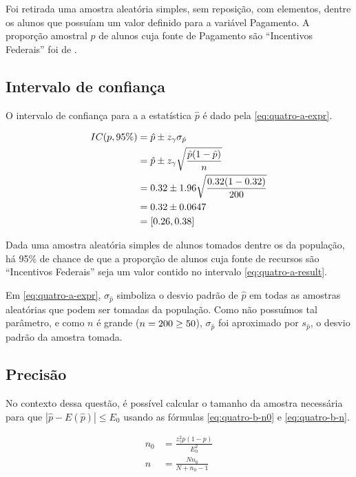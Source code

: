 

Foi retirada uma amostra aleatória simples, sem reposição, com \QUATROn elementos, dentre os \QUATRON alunos que possuíam um valor definido para a variável Pagamento. A proporção amostral $\hat{p}$ de alunos cuja fonte de Pagamento são ``Incentivos Federais'' foi de \QUATROpAmostral.

\subsection{Intervalo de confiança}
O intervalo de confiança para a a estatística $\hat{p}$ é dado pela \autoref{eq:quatro-a-expr}.

\begin{align} 
	IC(p, 95\%) \label{eq:quatro-a-expr}
	            &= \hat{p} \pm z_\gamma \sigma_{\hat{p}} \\
	            \label{eq:quatro-a-estim}
	            &= \hat{p} \pm z_\gamma \sqrt{\frac{\hat{p}(1-\hat{p})}{n}} \\
	            &= 0.32 \pm 1.96 \sqrt{\frac{0.32 (1- 0.32)}{200}} \nonumber \\
	            &= 0.32 \pm 0.0647 \nonumber \\
	            \label{eq:quatro-a-result}
	            &= [0.26, 0.38]
\end{align}

Dada uma amostra aleatória simples de \QUATROn alunos tomados dentre os \QUATRON da população, há 95\% de chance de que a proporção de alunos cuja fonte de recursos são ``Incentivos Federais'' seja um valor contido no intervalo \eqref{eq:quatro-a-result}.

Em \eqref{eq:quatro-a-expr}, $\sigma_{\hat{p}}$ simboliza o desvio padrão de $\hat{p}$ em todas as amostras aleatórias que podem ser tomadas da população. Como não possuímos tal parâmetro, e como $n$ é grande ($n = 200 \geq 50$), $\sigma_{\hat{p}}$ foi aproximado por $s_{\hat{p}}$, o desvio padrão da amostra tomada.

\subsection{Precisão}
No contexto dessa questão, é possível calcular o tamanho da amostra necessária para que $|\hat{p} - E(\hat{p})| \leq E_0$ usando as fórmulas \eqref{eq:quatro-b-n0} e \eqref{eq:quatro-b-n}.

\begin{align}
	n_0 &= \label{eq:quatro-b-n0}
	       \frac{z_\gamma^2 p(1-p)}{E_0^2} \\
	n &= \label{eq:quatro-b-n}
	     \frac{N n_0}{N + n_0 - 1} 
\end{align}

